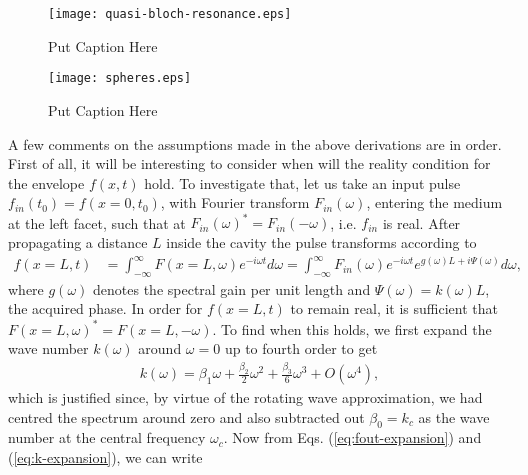 \documentclass[]{spie}  %
\begin{document}
\begin{figure}[h!] \begin{center}
 		\texttt{[image: quasi-bloch-resonance.eps]} \caption{ Put Caption
 			Here } \label{fig:quasi-bloch-resonance} \end{center}	\end{figure}



\begin{figure}[h!] \begin{center} \texttt{[image: spheres.eps]}
 		\caption{ Put Caption Here } \label{fig:spheres} \end{center}	\end{figure}


A few comments on the assumptions made in the above derivations are in order.
First of all, it will be interesting to consider when will the reality
condition for the envelope $f(x,t) $  hold. To investigate that, let us take an
input pulse $f_{in}(t_0) = f(x=0,t_0)$, with Fourier transform
$F_{in}(\omega)$, entering the medium at the left facet, such that at
$F_{in}(\omega)^* = F_{in}(-\omega)$, i.e. $f_{in}$ is real. After propagating
a distance $L$ inside the cavity the pulse transforms according to
\cite{weiner2011ultrafast} \begin{align} \label{eq:fout-expansion} f(x=L,t) &=
\int_{-\infty}^{\infty} F(x=L,\omega)e^{-i\omega t}d\omega =
\int_{-\infty}^{\infty} F_{in}(\omega)e^{-i\omega
 	t}e^{g(\omega)L+i\Psi(\omega)}d\omega, \end{align} where $g(\omega)$ denotes
the spectral gain per unit length and $\Psi(\omega)=k(\omega)L$, the acquired
phase. In order for $f(x=L,t)$ to remain real, it is sufficient that
$F(x=L,\omega)^*= F(x=L,-\omega)$. To find when this holds, we first expand the
wave number $k(\omega)$ around $\omega=0$ up to fourth order to get
\begin{align} \label{eq:k-expansion} k(\omega) = \beta_1\omega +
\frac{\beta_2}{2}\omega^2 + \frac{\beta_3}{6}\omega^3 + O(\omega^4),
\end{align} which is justified since, by virtue of the rotating wave
approximation, we had centred the spectrum around zero and also subtracted out
$\beta_0 = k_c$ as the wave number at the central frequency $\omega_c$. Now
from Eqs. (\ref{eq:fout-expansion}) and (\ref{eq:k-expansion}), we can write
\end{document}
